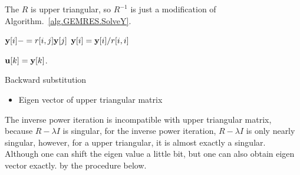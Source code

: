 The $R$ is upper triangular, so $R^{-1}$ is just a modification of Algorithm.~\ref{alg.GEMRES.SolveY}.
\begin{algorithm}[H]
\begin{algorithmic}
        \State ${\bf y}[i]-=r[i,j] {\bf y}[j]$
    \EndFor
    \State ${\bf y}[i] = {\bf y}[i] / r[i,i]$
\EndFor

\Return ${\bf u}[k]={\bf y}[k]$.
\end{algorithmic}
\caption{\label{alg.backsub}Backward substitution}
\end{algorithm}

\begin{itemize}
  \item Eigen vector of upper triangular matrix
\end{itemize}

The inverse power iteration is incompatible with upper triangular matrix, because $R-\lambda I$ is singular, for the inverse power iteration, $R-\lambda I$ is only nearly singular, however, for a upper triangular, it is almost exactly a singular. Although one can shift the eigen value a little bit, but one can also obtain eigen vector exactly. by the procedure below.

